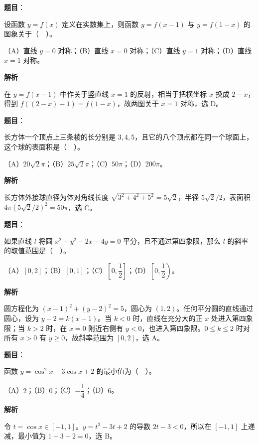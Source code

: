 \begin{answer}

\textbf{题目}：

设函数 $y=f(x)$ 定义在实数集上，则函数 $y=f(x-1)$ 与 $y=f(1-x)$ 的图象关于（　）。

（A）直线 $y=0$ 对称；（B）直线 $x=0$ 对称；（C）直线 $y=1$ 对称；（D）直线 $x=1$ 对称。

\textbf{解析}

在 $y=f(x-1)$ 中作关于竖直线 $x=1$ 的反射，相当于把横坐标 $x$ 换成 $2-x$，得到 $f((2-x)-1)=f(1-x)$，故两图关于 $x=1$ 对称，选 D。


\end{answer}
\begin{answer}

\textbf{题目}：

长方体一个顶点上三条棱的长分别是 $3,4,5$，且它的八个顶点都在同一个球面上，这个球的表面积是（　）。

（A）$20\sqrt2\pi$；（B）$25\sqrt2\pi$；（C）$50\pi$；（D）$200\pi$。

\textbf{解析}

长方体外接球直径为体对角线长度 $\sqrt{3^2+4^2+5^2}=5\sqrt2$，半径 $5\sqrt2/2$，表面积 $4\pi(5\sqrt2/2)^2=50\pi$，选 C。


\end{answer}
\begin{answer}

\textbf{题目}：

如果直线 $l$ 将圆 $x^2+y^2-2x-4y=0$ 平分，且不通过第四象限，那么 $l$ 的斜率的取值范围是（　）。

（A）$[0,2]$；（B）$[0,1]$；（C）$\left[0,\dfrac12\right]$；（D）$\left[0,\dfrac12\right)$。

\textbf{解析}

圆方程化为 $(x-1)^2+(y-2)^2=5$，圆心为 $(1,2)$。任何平分圆的直线通过圆心，设为 $y-2=k(x-1)$。当 $k<0$ 时，直线在充分大的正 $x$ 处进入第四象限；当 $k>2$ 时，在 $x=0$ 附近右侧有 $y<0$，也进入第四象限。$0\le k\le2$ 时对所有 $x>0$ 有 $y\ge0$，故斜率范围为 $[0,2]$，选 A。


\end{answer}
\begin{answer}

\textbf{题目}：

函数 $y=\cos^2x-3\cos x+2$ 的最小值为（　）。

（A）$2$；（B）$0$；（C）$-\dfrac14$；（D）$6$。

\textbf{解析}

令 $t=\cos x\in[-1,1]$。$y=t^2-3t+2$ 的导数 $2t-3<0$，所以在 $[-1,1]$ 上递减，最小值为 $1-3+2=0$，选 B。


\end{answer}
